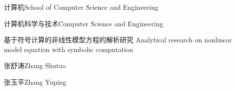 
\school
{计算机}{School of Computer Science and Engineering}

\major
{计算机科学与技术}{Computer Science and Engineering}

\thesistitle
{基于符号计算的非线性模型方程的解析研究}
{ }
{Analytical research on nonlinear model equation with symbolic computation}

\thesisauthor
{张舒涛}{Zhang Shutao}

\teacher
{张玉平}{Zhang Yuping}






